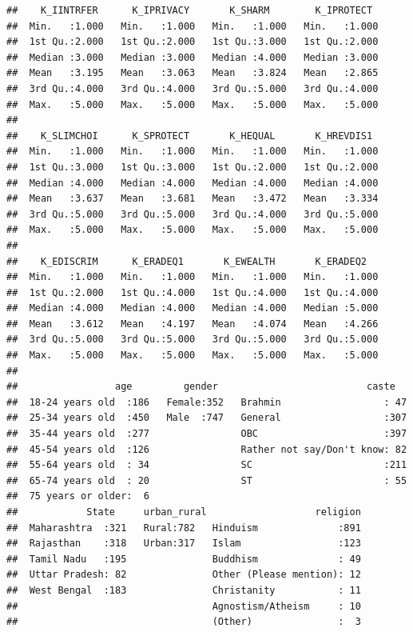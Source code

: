\documentclass[
]{article}
\begin{document}
\begin{verbatim}
##    K_IINTRFER      K_IPRIVACY       K_SHARM        K_IPROTECT   
##  Min.   :1.000   Min.   :1.000   Min.   :1.000   Min.   :1.000  
##  1st Qu.:2.000   1st Qu.:2.000   1st Qu.:3.000   1st Qu.:2.000  
##  Median :3.000   Median :3.000   Median :4.000   Median :3.000  
##  Mean   :3.195   Mean   :3.063   Mean   :3.824   Mean   :2.865  
##  3rd Qu.:4.000   3rd Qu.:4.000   3rd Qu.:5.000   3rd Qu.:4.000  
##  Max.   :5.000   Max.   :5.000   Max.   :5.000   Max.   :5.000  
##                                                                 
##    K_SLIMCHOI      K_SPROTECT       K_HEQUAL       K_HREVDIS1   
##  Min.   :1.000   Min.   :1.000   Min.   :1.000   Min.   :1.000  
##  1st Qu.:3.000   1st Qu.:3.000   1st Qu.:2.000   1st Qu.:2.000  
##  Median :4.000   Median :4.000   Median :4.000   Median :4.000  
##  Mean   :3.637   Mean   :3.681   Mean   :3.472   Mean   :3.334  
##  3rd Qu.:5.000   3rd Qu.:5.000   3rd Qu.:4.000   3rd Qu.:5.000  
##  Max.   :5.000   Max.   :5.000   Max.   :5.000   Max.   :5.000  
##                                                                 
##    K_EDISCRIM      K_ERADEQ1       K_EWEALTH       K_ERADEQ2    
##  Min.   :1.000   Min.   :1.000   Min.   :1.000   Min.   :1.000  
##  1st Qu.:2.000   1st Qu.:4.000   1st Qu.:4.000   1st Qu.:4.000  
##  Median :4.000   Median :4.000   Median :4.000   Median :5.000  
##  Mean   :3.612   Mean   :4.197   Mean   :4.074   Mean   :4.266  
##  3rd Qu.:5.000   3rd Qu.:5.000   3rd Qu.:5.000   3rd Qu.:5.000  
##  Max.   :5.000   Max.   :5.000   Max.   :5.000   Max.   :5.000  
##                                                                 
##                 age         gender                          caste    
##  18-24 years old  :186   Female:352   Brahmin                  : 47  
##  25-34 years old  :450   Male  :747   General                  :307  
##  35-44 years old  :277                OBC                      :397  
##  45-54 years old  :126                Rather not say/Don't know: 82  
##  55-64 years old  : 34                SC                       :211  
##  65-74 years old  : 20                ST                       : 55  
##  75 years or older:  6                                               
##            State     urban_rural                   religion  
##  Maharashtra  :321   Rural:782   Hinduism              :891  
##  Rajasthan    :318   Urban:317   Islam                 :123  
##  Tamil Nadu   :195               Buddhism              : 49  
##  Uttar Pradesh: 82               Other (Please mention): 12  
##  West Bengal  :183               Christanity           : 11  
##                                  Agnostism/Atheism     : 10  
##                                  (Other)               :  3
\end{verbatim}
\end{document}
